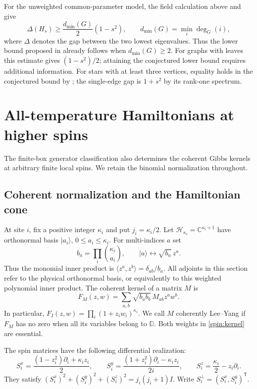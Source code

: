 \documentclass[reqno]{amsart}
\theoremstyle{definition}
\theoremstyle{remark}
\newcommand{\C}{\mathbb C}
\newcommand{\D}{\mathbb D}
\begin{document}
For the unweighted common-parameter model, the field calculation above
and \cite[Theorem~1]{BGLW26} give
\[
 \Delta(H_s)\geq \frac{d_{\min}(G)}2(1-s^2),
 \qquad d_{\min}(G)=\min_i\deg_G(i),
\]
where $\Delta$ denotes the gap between the two lowest eigenvalues.
Thus the lower bound proposed in \cite[Conjecture~3]{WBG26} already
follows when $d_{\min}(G)\geq2$. For graphs with leaves this estimate
gives $(1-s^2)/2$; attaining the conjectured lower bound requires
additional information. For stars with at least three vertices,
equality holds in the conjectured bound by \cite[Lemma~13]{WBG26};
the single-edge gap is $1+s^2$ by its rank-one spectrum.


\section{All-temperature Hamiltonians at higher spins}\label{spin:section}

The finite-box generator classification also determines the coherent Gibbs kernels
at arbitrary finite local spins. We retain the binomial normalization throughout.

\subsection{Coherent normalization and the Hamiltonian cone}

At site $i$, fix a positive integer $\kappa_i$ and put $j_i=\kappa_i/2$.
Let $\mathcal H_{\kappa_i}=\C^{\kappa_i+1}$ have orthonormal basis
$|a_i\rangle$, $0\leq a_i\leq\kappa_i$.  For multi-indices $a$ set
\begin{equation}\label{spin:weights}
 b_a=\prod_i\binom{\kappa_i}{a_i},\qquad
 |a\rangle\longleftrightarrow \sqrt{b_a}\,z^a.
\end{equation}
Thus the monomial inner product is
$\langle z^a,z^b\rangle=\delta_{ab}/b_a$.  All adjoints in this section
refer to the physical orthonormal basis, or equivalently to this weighted
polynomial inner product.  The coherent kernel of a matrix $M$ is
\begin{equation}\label{spin:kernel}
 F_M(z,w)=\sum_{a,b}\sqrt{b_a b_b}\,M_{ab}z^a w^b.
\end{equation}
In particular, $F_I(z,w)=\prod_i(1+z_iw_i)^{\kappa_i}$.
We call $M$ coherently Lee--Yang if $F_M$ has no zero when all its variables
belong to $\D$.  Both weights in \eqref{spin:kernel} are essential.

The spin matrices have the following differential realization:
\begin{equation}\label{spin:differential}
 S_i^x=\frac{(1-z_i^2)\partial_i+\kappa_i z_i}{2},\qquad
 S_i^y=\frac{(1+z_i^2)\partial_i-\kappa_i z_i}{2i},\qquad
 S_i^z=\frac{\kappa_i}{2}-z_i\partial_i.
\end{equation}
They satisfy
$(S_i^x)^2+(S_i^y)^2+(S_i^z)^2=j_i(j_i+1)I$.
Write $S_i^\perp=(S_i^x,S_i^y)^{\mathsf T}$.
\end{document}
